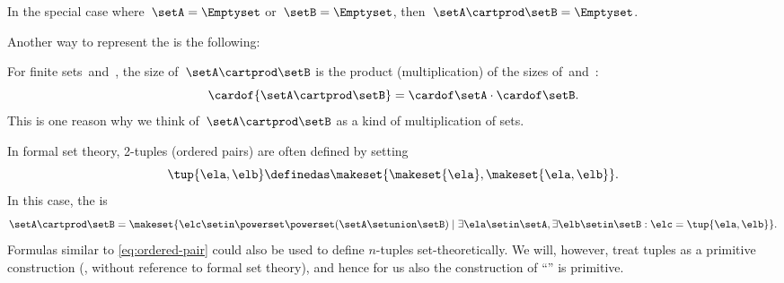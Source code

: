 In the special case where~$\setA = \Emptyset$ or~$\setB = \Emptyset$, then~$\setA \cartprod \setB = \Emptyset$.

Another way to represent the  is the following:
%

%

\begin{remark}
    For finite sets~\setA and~\setB, the size of~$\setA \cartprod \setB$ is the product (multiplication) of the sizes of~\setA and~\setB:
    \begin{equation}
        \cardof{\setA \cartprod \setB} = \cardof\setA \cdot \cardof \setB.
    \end{equation}
    This is one reason why we think of~$\setA \cartprod \setB$ as a kind of multiplication of sets.
\end{remark}

\begin{remark}
    In formal set theory, 2-tuples (ordered pairs) are often defined by setting
    \begin{equation}
        \label{eq:ordered-pair}
        \tup{\ela, \elb} \definedas \makeset{ \makeset{\ela }, \makeset{ \ela, \elb } }.
    \end{equation}
    In this case, the  is
    \begin{equation}
        \setA \cartprod \setB = \makeset{ \elc \setin\powerset \powerset (\setA \setunion \setB) \mid \exists \ela \setin\setA, \exists \elb \setin\setB : \elc = \tup{\ela, \elb} }.
    \end{equation}
    Formulas similar to \cref{eq:ordered-pair} could also be used to define $n$-tuples set-theoretically.
    We will, however, treat tuples as a primitive construction (\ie, without reference to formal set theory), and hence for us also the construction of ``'' is primitive.
\end{remark}

